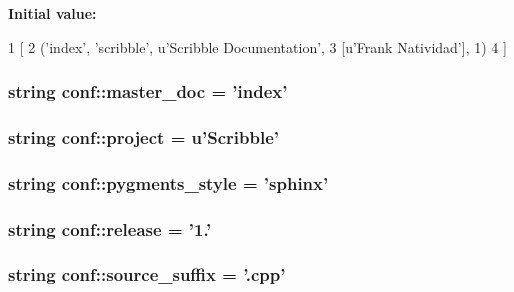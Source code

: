 {\bfseries \-Initial value\-:}
\begin{DoxyCode}
1 [
2     ('index', 'scribble', u'Scribble Documentation',
3      [u'Frank Natividad'], 1)
4 ]
\end{DoxyCode}
\hypertarget{namespaceconf_ae22a29d94a222730836db739d6dbd71e}{
\subsubsection[{master\-\_\-doc}]{\setlength{\rightskip}{0pt plus 5cm}string {\bf conf\-::master\-\_\-doc} = 'index'}}\label{namespaceconf_ae22a29d94a222730836db739d6dbd71e}
\hypertarget{namespaceconf_aa2c6aefbed1597a70cfb45a760e5977c}{
\subsubsection[{project}]{\setlength{\rightskip}{0pt plus 5cm}string {\bf conf\-::project} = u'\-Scribble'}}\label{namespaceconf_aa2c6aefbed1597a70cfb45a760e5977c}
\hypertarget{namespaceconf_afa4e4ed164119ef5f4656e9554ed1f1b}{
\subsubsection[{pygments\-\_\-style}]{\setlength{\rightskip}{0pt plus 5cm}string {\bf conf\-::pygments\-\_\-style} = 'sphinx'}}\label{namespaceconf_afa4e4ed164119ef5f4656e9554ed1f1b}
\hypertarget{namespaceconf_a90a599726178800ad5a42f6bc2cd5208}{
\subsubsection[{release}]{\setlength{\rightskip}{0pt plus 5cm}string {\bf conf\-::release} = '1.'}}\label{namespaceconf_a90a599726178800ad5a42f6bc2cd5208}
\hypertarget{namespaceconf_a1e0ba7f4cb1d50fa831f1236a77d60f6}{
\subsubsection[{source\-\_\-suffix}]{\setlength{\rightskip}{0pt plus 5cm}string {\bf conf\-::source\-\_\-suffix} = '.cpp'}}\label{namespaceconf_a1e0ba7f4cb1d50fa831f1236a77d60f6}
